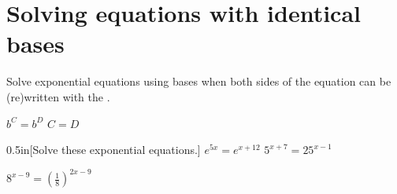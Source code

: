 \section{Solving equations with identical bases}
\begin{minipage}{0.55\textwidth}
    Solve exponential equations using
     bases when both sides of the equation
    can be (re)written with the .
\end{minipage}
\begin{minipage}{0.44\textwidth}
    \begin{myCenteredBox}[width=2.75in,]
        \centering\large
        $b^C = b^D$ \quad {\Large $\Longleftrightarrow$} \quad $C = D$
    \end{myCenteredBox}
\end{minipage}


\begin{my2Problems}[\normalsize]{0.5in}[Solve these exponential equations.]
    {
        $e^{5x} = e^{x+12}$
    }
    {
        $5^{x+7} = 25^{x-1}$
    }
\end{my2Problems}

\begin{myProblem}[\normalsize]{0.75in}
    {
        $8^{x-9} = \left(\frac{1}{8}\right)^{2x-9}$
    }
\end{myProblem}
